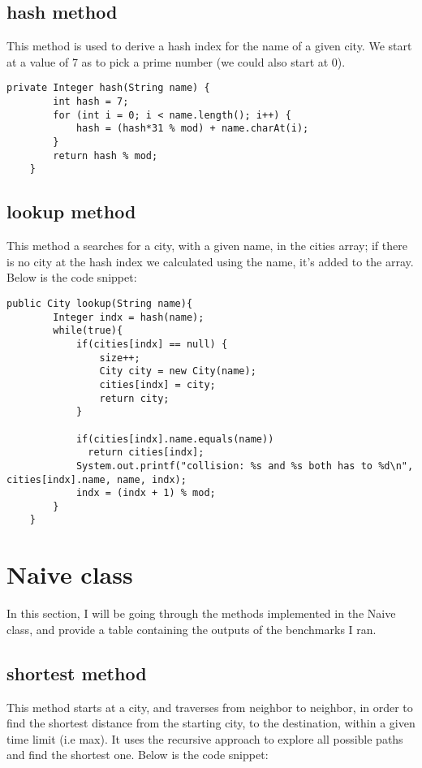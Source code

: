 \documentclass[a4paper,11pt]{article}
\begin{document}
\subsection*{hash method}
This method is used to derive a hash index for the name of a given city. We start at a value of 7 as to pick a prime number (we could also start at 0).

\begin{verbatim}
private Integer hash(String name) {
        int hash = 7;
        for (int i = 0; i < name.length(); i++) {
            hash = (hash*31 % mod) + name.charAt(i);
        }
        return hash % mod;
    }
\end{verbatim}


\subsection*{lookup method}
This method a searches for a city, with a given name, in the cities array; if there is no city at the hash index we calculated using the name, it's added to the array. Below is the code snippet:

\begin{verbatim}
public City lookup(String name){
        Integer indx = hash(name);
        while(true){
            if(cities[indx] == null) {
                size++;
                City city = new City(name);
                cities[indx] = city;
                return city;
            }

            if(cities[indx].name.equals(name))
              return cities[indx];
            System.out.printf("collision: %s and %s both has to %d\n", cities[indx].name, name, indx);
            indx = (indx + 1) % mod;
        }
    }
\end{verbatim}


\section*{Naive class}
In this section, I will be going through the methods implemented in the Naive class, and provide a table containing the outputs of the benchmarks I ran.


\subsection*{shortest method}
This method starts at a city, and traverses from neighbor to neighbor,  in order to find the shortest distance from the starting city, to the destination, within a given time limit (i.e max). It uses the recursive approach to explore all possible paths and find the shortest one. Below is the code snippet:
\end{document}
